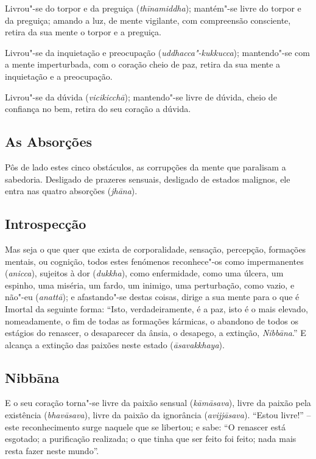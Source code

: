 Livrou"-se do torpor e da preguiça (\emph{thīnamiddha}); mantém"-se livre do
torpor e da preguiça; amando a luz, de mente vigilante, com compreensão
consciente, retira da sua mente o torpor e a preguiça.

Livrou"-se da inquietação e preocupação (\emph{uddhacca"-kukkucca}); mantendo"-se
com a mente imperturbada, com o coração cheio de paz, retira da sua mente a
inquietação e a preocupação.

Livrou"-se da dúvida (\emph{vicikicchā}); mantendo"-se livre de dúvida, cheio de confiança no bem, retira do seu coração a dúvida.

\subsection{As Absorções}


Pôs de lado estes cinco obstáculos, as corrupções da mente que paralisam a
sabedoria. Desligado de prazeres sensuais, desligado de estados malignos, ele
entra nas quatro absorções (\emph{jhāna}).


\subsection{Introspecção}


Mas seja o que quer que exista de corporalidade, sensação, percepção, formações
mentais, ou cognição, todos estes fenómenos reconhece"-os como impermanentes
(\emph{anicca}), sujeitos à dor (\emph{dukkha}), como enfermidade, como uma
úlcera, um espinho, uma miséria, um fardo, um inimigo, uma perturbação, como
vazio, e não"-eu (\emph{anattā}); e afastando"-se destas coisas, dirige a sua
mente para o que é Imortal da seguinte forma: “Isto, verdadeiramente, é a paz,
isto é o mais elevado, nomeadamente, o fim de todas as formações kármicas, o
abandono de todos os estágios do renascer, o desaparecer da ânsia, o desapego, a
extinção, \emph{Nibbāna}.” E alcança a extinção das paixões neste estado
(\emph{āsavakkhaya}).


\subsection{Nibbāna}

E o seu coração torna"-se livre da paixão sensual (\emph{kāmāsava}), livre da
paixão pela existência (\emph{bhavāsava}), livre da paixão da ignorância
(\emph{avijjāsava}). “Estou livre!” -- este reconhecimento surge naquele que
se libertou; e sabe: “O renascer está esgotado; a purificação realizada; o que
tinha que ser feito foi feito; nada mais resta fazer neste mundo”.

